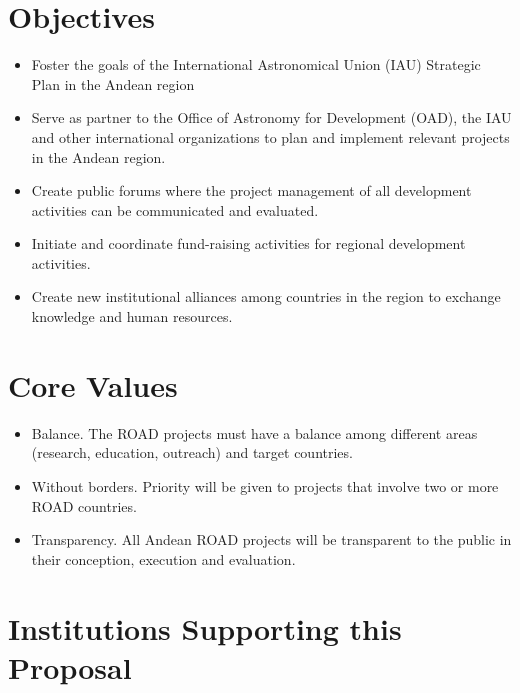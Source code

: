 \documentclass[12pt]{article}
\begin{document}
\section{Objectives}
\begin{itemize}
\item
Foster the goals of the International Astronomical Union (IAU) Strategic Plan in the Andean region
\item
Serve as partner to the Office of Astronomy for Development (OAD), the IAU and other international
organizations to plan and implement relevant projects in the Andean
region. 
\item
Create public forums where the project management of all development
activities can be communicated and evaluated. 
\item
Initiate and coordinate fund-raising activities for regional
development activities. 
\item
Create new institutional alliances among countries in the region to
exchange knowledge and human resources. 
\end{itemize}

\section{Core Values}
\begin{itemize}
\item 
Balance. The ROAD projects must have a balance among different areas
(research, education, outreach) and target countries. 
\item
Without borders. Priority will be given to projects that involve two
or more ROAD countries. 
\item
Transparency. All Andean ROAD projects will be transparent to the
public in their conception, execution and evaluation. 
\end{itemize}

\section{Institutions Supporting this Proposal}
\end{document}
